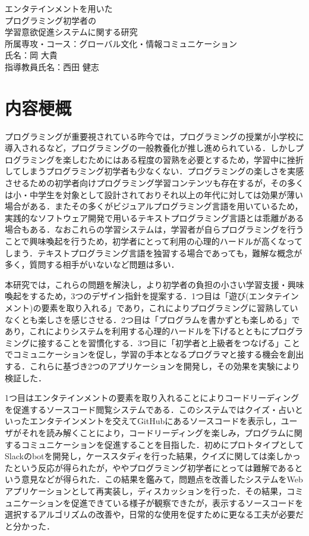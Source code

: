 \begin{center}
  {\Large エンタテインメントを用いた\\プログラミング初学者の\\学習意欲促進システムに関する研究}\\
  \vspace{20truept}
    \large{所属専攻・コース：グローバル文化・情報コミュニケーション\\}
    \large{氏名：岡 大貴\\}
    \large{指導教員氏名：西田 健志\\}
\end{center}

\section*{内容梗概}

プログラミングが重要視されている昨今では，プログラミングの授業が小学校に導入されるなど，プログラミングの一般教養化が推し進められている．しかしプログラミングを楽しむためにはある程度の習熟を必要とするため，学習中に挫折してしまうプログラミング初学者も少なくない．プログラミングの楽しさを実感させるための初学者向けプログラミング学習コンテンツも存在するが，その多くは小・中学生を対象として設計されておりそれ以上の年代に対しては効果が薄い場合がある．またその多くがビジュアルプログラミング言語を用いているため，実践的なソフトウェア開発で用いるテキストプログラミング言語とは乖離がある場合もある．なおこれらの学習システムは，学習者が自らプログラミングを行うことで興味喚起を行うため，初学者にとって利用の心理的ハードルが高くなってしまう．テキストプログラミング言語を独習する場合であっても，難解な概念が多く，質問する相手がいないなど問題は多い．

本研究では，これらの問題を解決し，より初学者の負担の小さい学習支援・興味喚起をするため，3つのデザイン指針を提案する．1つ目は「遊び(エンタテインメント)の要素を取り入れる」であり，これによりプログラミングに習熟していなくとも楽しさを感じさせる．2つ目は「プログラムを書かずとも楽しめる」であり，これによりシステムを利用する心理的ハードルを下げるとともにプログラミングに接することを習慣化する．3つ目に「初学者と上級者をつなげる」ことでコミュニケーションを促し，学習の手本となるプログラマと接する機会を創出する．これらに基づき2つのアプリケーションを開発し，その効果を実験により検証した．

1つ目はエンタテインメントの要素を取り入れることによりコードリーディングを促進するソースコード閲覧システムである．このシステムではクイズ・占いといったエンタテインメントを交えてGitHubにあるソースコードを表示し，ユーザがそれを読み解くことにより，コードリーディングを楽しみ，プログラムに関するコミュニケーションを促進することを目指した．初めにプロトタイプとしてSlackのbotを開発し，ケーススタディを行った結果，クイズに関しては楽しかったという反応が得られたが，ややプログラミング初学者にとっては難解であるという意見などが得られた．この結果を鑑みて，問題点を改善したシステムをWebアプリケーションとして再実装し，ディスカッションを行った．その結果，コミュニケーションを促進できている様子が観察できたが，表示するソースコードを選択するアルゴリズムの改善や，日常的な使用を促すために更なる工夫が必要だと分かった．

